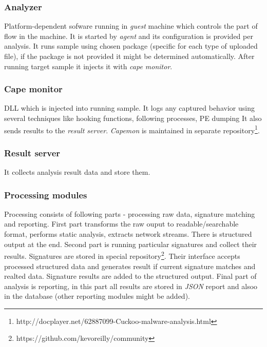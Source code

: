 \subsubsection*{Analyzer}
Platform-dependent sofware running in \emph{guest} machine which controls the part of flow in the machine. It is started by \emph{agent} and its configuration is provided per analysis. It runs sample using chosen package (specific for each type of uploaded file), if the package is not provided it might be determined automatically. After running target sample it injects it with \emph{cape monitor}.

\subsubsection*{Cape monitor}
DLL which is injected into running sample. It logs any captured behavior using several techniques like hooking functions, following processes, PE dumping It also sends results to the \emph{result server}. \emph{Capemon} is maintained in separate repository\footnote{http://docplayer.net/62887099-Cuckoo-malware-analysis.html}.

\subsubsection*{Result server}
It collects analysis result data and store them.

\subsubsection*{Processing modules}
Processing consists of following parts - processing raw data, signature matching and reporting. First part transforms the raw ouput to readable/searchable format, performs static analysis, extracts network streams. There is structured output at the end. Second part is running particular signatures and collect their results. Signatures are stored in special repository\footnote{https://github.com/kevoreilly/community}. Their interface accepts processed structured data and generates result if current signature matches and realted data. Signature results are added to the structured output. Final part of analysis is reporting, in this part all results are stored in \emph{JSON} report and alsoo in the database (other reporting modules might be added).

